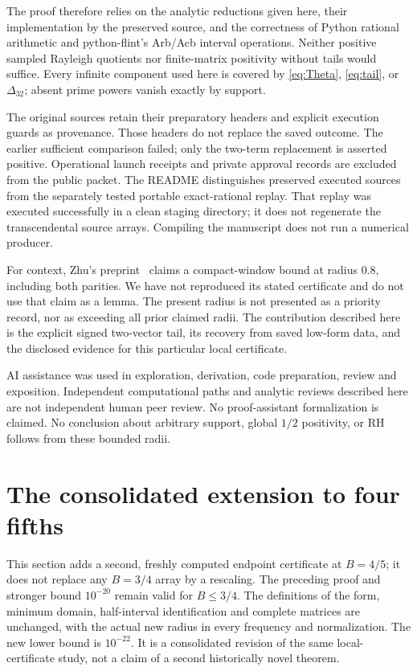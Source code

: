 \documentclass[11pt]{article}
\begin{document}
The proof therefore relies on the analytic reductions given here, their implementation by the preserved source, and the correctness of Python rational arithmetic and python-flint's Arb/Acb interval operations. Neither positive sampled Rayleigh quotients nor finite-matrix positivity without tails would suffice. Every infinite component used here is covered by \eqref{eq:Theta}, \eqref{eq:tail}, or $\Delta_{32}$; absent prime powers vanish exactly by support.

The original sources retain their preparatory headers and explicit execution guards as provenance. Those headers do not replace the saved outcome. The earlier sufficient comparison failed; only the two-term replacement is asserted positive. Operational launch receipts and private approval records are excluded from the public packet. The README distinguishes preserved executed sources from the separately tested portable exact-rational replay. That replay was executed successfully in a clean staging directory; it does not regenerate the transcendental source arrays. Compiling the manuscript does not run a numerical producer.

For context, Zhu's preprint~\cite{zhu} claims a compact-window bound at radius $0.8$, including both parities. We have not reproduced its stated certificate and do not use that claim as a lemma. The present radius is not presented as a priority record, nor as exceeding all prior claimed radii. The contribution described here is the explicit signed two-vector tail, its recovery from saved low-form data, and the disclosed evidence for this particular local certificate.

AI assistance was used in exploration, derivation, code preparation, review and exposition. Independent computational paths and analytic reviews described here are not independent human peer review. No proof-assistant formalization is claimed. No conclusion about arbitrary support, global $1/2$ positivity, or RH follows from these bounded radii.

\section{The consolidated extension to four fifths}\label{sec:080}
This section adds a second, freshly computed endpoint certificate at $B=4/5$; it does not replace any $B=3/4$ array by a rescaling. The preceding proof and stronger bound $10^{-20}$ remain valid for $B\le3/4$. The definitions of the form, minimum domain, half-interval identification and complete matrices are unchanged, with the actual new radius in every frequency and normalization. The new lower bound is $10^{-22}$. It is a consolidated revision of the same local-certificate study, not a claim of a second historically novel theorem.
\end{document}
